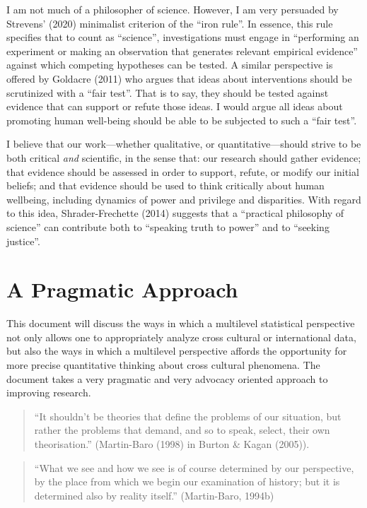 \documentclass[
  letterpaper,
  DIV=11,
  numbers=noendperiod]{scrreprt}
\begin{document}
I am not much of a philosopher of science. However, I am very persuaded
by Strevens' (2020) minimalist criterion of the ``iron rule''. In
essence, this rule specifies that to count as ``science'',
investigations must engage in ``performing an experiment or making an
observation that generates relevant empirical evidence'' against which
competing hypotheses can be tested. A similar perspective is offered by
Goldacre (2011) who argues that ideas about interventions should be
scrutinized with a ``fair test''. That is to say, they should be tested
against evidence that can support or refute those ideas. I would argue
all ideas about promoting human well-being should be able to be
subjected to such a ``fair test''.

I believe that our work---whether qualitative, or quantitative---should
strive to be both critical \emph{and} scientific, in the sense that: our
research should gather evidence; that evidence should be assessed in
order to support, refute, or modify our initial beliefs; and that
evidence should be used to think critically about human wellbeing,
including dynamics of power and privilege and disparities. With regard
to this idea, Shrader-Frechette (2014) suggests that a ``practical
philosophy of science'' can contribute both to ``speaking truth to
power'' and to ``seeking justice''.

\section{A Pragmatic Approach}\label{a-pragmatic-approach}

This document will discuss the ways in which a multilevel statistical
perspective not only allows one to appropriately analyze cross cultural
or international data, but also the ways in which a multilevel
perspective affords the opportunity for more precise quantitative
thinking about cross cultural phenomena. The document takes a very
pragmatic and very advocacy oriented approach to improving research.

\begin{quote}
``It shouldn't be theories that define the problems of our situation,
but rather the problems that demand, and so to speak, select, their own
theorisation.'' (Martin-Baro (1998) in Burton \& Kagan (2005)).
\end{quote}

\begin{quote}
``What we see and how we see is of course determined by our perspective,
by the place from which we begin our examination of history; but it is
determined also by reality itself.'' (Martin-Baro, 1994b)
\end{quote}
\end{document}
